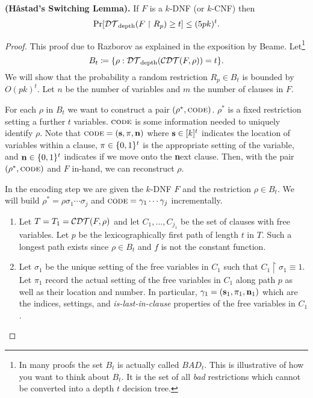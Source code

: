 \documentclass[11pt]{article}
\begin{document}
	\begin{theorem}
		\label{thm:haastadswitchinglemma}
		\textbf{(H\aa stad's Switching Lemma).} If $F$ is a $k$-DNF (or $k$-CNF) then
		\[\Pr[\mathcal{DT}_{\mathrm{depth}}(F \upharpoonright R_p) \geq t] \leq (5pk)^t.\]
	\end{theorem}
	\begin{proof}
		This proof due to Razborov as explained in the exposition by Beame. Let\footnote{In many proofs the set $B_t$ is actually called $BAD_t$. This is illustrative of how you want to think about $B_t$. It is the set of all \emph{bad} restrictions which cannot be converted into a depth $t$ decision tree.} 
		\[B_t \coloneqq \{\rho: \mathcal{DT}_{\mathrm{depth}}(\mathcal{CDT}(F, \rho)) = t\}.\]
		We will show that the probability a random restriction $R_p \in B_t$ is bounded by $O(pk)^t$. Let $n$ be the number of variables and $m$ the number of clauses in $F$.
		
		For each $\rho$ in $B_t$ we want to construct a pair $(\rho^*, \textsc{code})$. $\rho^*$ is a fixed restriction setting a further $t$ variables. $\textsc{code}$ is some information needed to uniquely identify $\rho$. Note that $\textsc{code} = \left(\mathbf{s}, \mathbf{\pi}, \mathbf{n}\right)$ where $\mathbf{s} \in [k]^t$ indicates the location of variables within a clause, $\mathbf{\pi} \in \{0,1\}^t$ is the appropriate setting of the variable, and $\mathbf{n} \in \{0,1\}^t$ indicates if we move onto the \textbf{n}ext clause. Then, with the pair $(\rho^*, \textsc{code})$ and $F$ in-hand, we can reconstruct $\rho$.
		
		In the encoding step we are given the $k$-DNF $F$ and the restriction $\rho \in B_t$. We will build $\rho^* = \rho\sigma_1\cdots\sigma_j$ and $\textsc{code} = \gamma_1\cdots\gamma_j$ incrementally.
		\begin{enumerate}
			\item Let $T = T_1 = \mathcal{CDT}(F, \rho)$ and let $C_{1}, ..., C_{j_1}$ be the set of clauses with free variables. Let $p$ be the lexicographically first path of length $t$ in $T$. Such a longest path exists since $\rho \in B_t$ and $f$ is not the constant function.
			\item Let $\sigma_1$ be the unique setting of the free variables in $C_{1}$ such that $C_{1} \upharpoonright \sigma_1 \equiv 1$. Let $\pi_{1}$ record the actual setting of the free variables in $C_{1}$ along path $p$ as well as their location and number. In particular, $\gamma_1 = (\mathbf{s}_1, \mathbf{\pi}_1, \mathbf{n}_1)$ which are the indices, settings, and \emph{is-last-in-clause} properties of the free variables in $C_{1}$.
			

\end{enumerate}
\end{proof}
\end{document}

